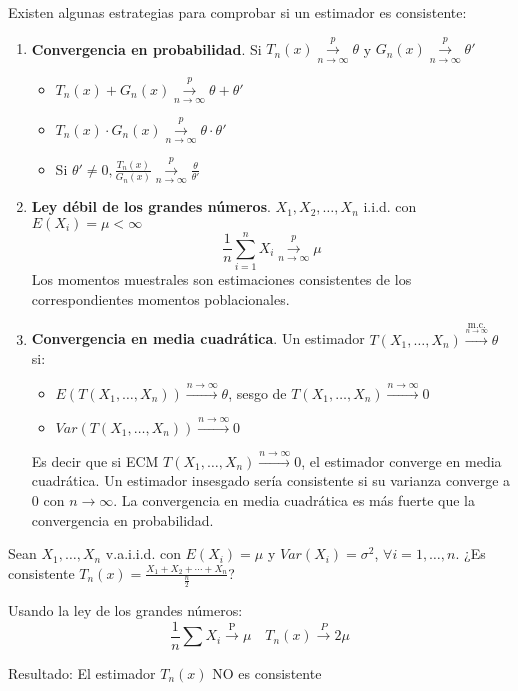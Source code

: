 Existen algunas estrategias para comprobar si un estimador es consistente:
\begin{enumerate}
    \item \textbf{Convergencia en probabilidad}. Si $T_n(x) \overset{p}{\underset{n \to \infty}{\to}} \theta$ y $G_n(x) \overset{p}{\underset{n \to \infty}{\to}} \theta'$
          \begin{itemize}
              \item $T_n(x)+G_n(x) \overset{p}{\underset{n \to \infty}{\to}} \theta + \theta '$
              \item $T_n(x) \cdot G_n(x) \overset{p}{\underset{n \to \infty}{\to}} \theta \cdot \theta '$
              \item Si $\theta' \neq 0, \frac{T_n(x)}{G_n(x)} \overset{p}{\underset{n \to \infty}{\to}} \frac{\theta}{\theta '}$
          \end{itemize}

    \item \textbf{Ley débil de los grandes números}. $X_1, X_2, \dots, X_n$ i.i.d. con $E(X_i)=\mu < \infty$
          \[\frac{1}{n}\sum_{i=1}^{n} X_i \overset{p}{\underset{n \to \infty}{\to}} \mu\]
          Los momentos muestrales son estimaciones consistentes de los correspondientes momentos poblacionales.

    \item \textbf{Convergencia en media cuadrática}. Un estimador $T(X_1, \dots, X_n)\xrightarrow{\underset{n \to \infty}{\text{m.c.}}} \theta$ si:
          \begin{itemize}
              \item $E(T(X_1, \dots, X_n)) \xrightarrow{{n \to \infty}} \theta$, sesgo de $T(X_1, \dots, X_n)\xrightarrow{{n \to \infty}} 0$
              \item $Var(T(X_1, \dots, X_n)) \xrightarrow{{n \to \infty}} 0$
          \end{itemize}
          Es decir que si ECM $T(X_1, \dots, X_n) \xrightarrow{{n \to \infty}} 0$, el estimador converge en media cuadrática. Un estimador insesgado sería consistente si su varianza converge a 0 con $n \to \infty$. La convergencia en media cuadrática es más fuerte que la convergencia en probabilidad.
\end{enumerate}

\begin{exercise}
    Sean $X_1, \dots, X_n$ v.a.i.i.d. con $E(X_i)=\mu$ y $Var(X_i)=\sigma^2$, $\forall i=1, \dots, n$. ¿Es consistente $T_n(x) = \frac{X_1 + X_2 + \dotsb + X_n}{\frac{n}{2}}$?

    Usando la ley de los grandes números:
    \[
        \frac{1}{n}\sum X_i \xrightarrow{\text{P}} \mu \quad T_n(x)\xrightarrow{P}2\mu
    \]

    Resultado: El estimador $T_n(x)$ NO es consistente
\end{exercise}

